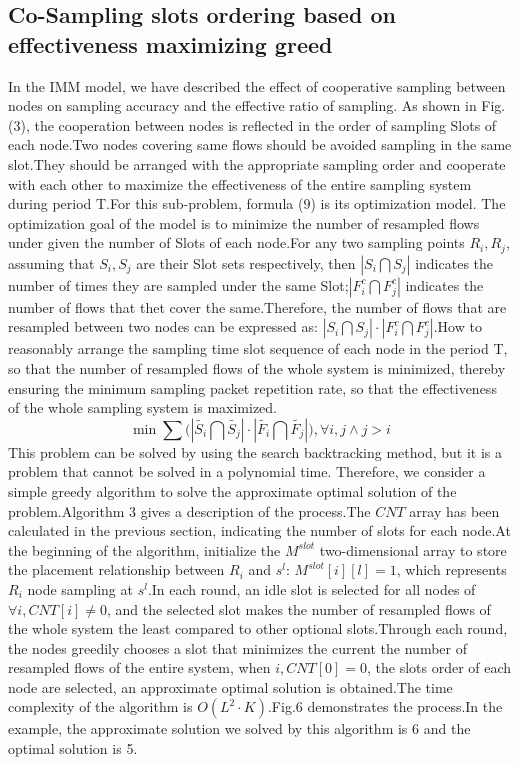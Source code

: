 \documentclass[conference,compsoc]{IEEEtran}
\begin{document}
\subsection{Co-Sampling slots ordering based on effectiveness maximizing greed}
In the IMM model, we have described the effect of cooperative sampling between nodes on sampling accuracy and the effective ratio of sampling. As shown in Fig. (3), the cooperation between nodes is reflected in the order of sampling Slots of each node.Two nodes covering same flows should be avoided sampling in the same slot.They should be arranged with the appropriate sampling order and cooperate with each other to maximize the effectiveness of the entire sampling system during period T.For this sub-problem, formula (9) is its optimization model. The optimization goal of the model is to minimize the number of resampled flows under given the number of Slots of each node.For any two sampling points $R_i, R_j$, assuming that $S_i, S_j$ are their Slot sets respectively, then $|S_i \bigcap S_j|$ indicates the number of times they are sampled under the same Slot;$|F_i^c \bigcap F_j^c|$ indicates the number of flows that thet cover the same.Therefore, the number of flows that are resampled between two nodes can be expressed as: $|S_i \bigcap S_j| \cdot |F_i^c \bigcap F_j^c|$.How to reasonably arrange the sampling time slot sequence of each node in the period T, so that the number of resampled flows of the whole system is minimized, thereby ensuring the minimum sampling packet repetition rate, so that the effectiveness of the whole sampling system is maximized.
\begin{equation}
\min \sum{(\left| \widetilde{{{S}_{i}}}\bigcap \widetilde{{{S}_{j}}} \right|}\cdot \left| \widetilde{{{F}_{i}}}\bigcap \widetilde{{{F}_{j}}} \right|),\forall i,j\wedge j>i
\end{equation}
This problem can be solved by using the search backtracking method, but it is a problem that cannot be solved in a polynomial time. Therefore, we consider a simple greedy algorithm to solve the approximate optimal solution of the problem.Algorithm 3 gives a description of the process.The $CNT$ array has been calculated in the previous section, indicating the number of slots for each node.At the beginning of the algorithm, initialize the $M^{slot}$ two-dimensional array to store the placement relationship between $R_i$ and $s^l$: $M^{slot}[i][l]=1$, which represents $R_i$ node sampling at $s^l$.In each round, an idle slot is selected for all nodes of $\forall i, CNT[i]\neq 0$, and the selected slot makes the number of resampled flows of the whole system the least compared to other optional slots.Through each round, the nodes greedily chooses a slot that minimizes the current the number of resampled flows of the entire system, when $i, CNT[0]=0$, the slots order of each node are selected, an approximate optimal solution is obtained.The time complexity of the algorithm is $O(L^2 \cdot K)$.Fig.6 demonstrates the process.In the example, the approximate solution we solved by this algorithm is 6 and the optimal solution is 5.
\end{document}
